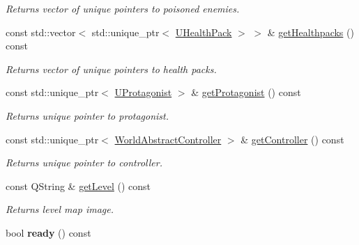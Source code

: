 \begin{DoxyCompactItemize}
\begin{DoxyCompactList}\small\item\em Returns vector of unique pointers to poisoned enemies. \end{DoxyCompactList}\item 
const std\+::vector$<$ std\+::unique\+\_\+ptr$<$ \hyperlink{classUHealthPack}{U\+Health\+Pack} $>$ $>$ \& \hyperlink{classWorldModel_a81a07a89bb6f67371553656b1780f54d}{get\+Healthpacks} () const \hypertarget{classWorldModel_a81a07a89bb6f67371553656b1780f54d}{}\label{classWorldModel_a81a07a89bb6f67371553656b1780f54d}

\begin{DoxyCompactList}\small\item\em Returns vector of unique pointers to health packs. \end{DoxyCompactList}\item 
const std\+::unique\+\_\+ptr$<$ \hyperlink{classUProtagonist}{U\+Protagonist} $>$ \& \hyperlink{classWorldModel_ae77f38af10f91c3ce963633530f0644a}{get\+Protagonist} () const \hypertarget{classWorldModel_ae77f38af10f91c3ce963633530f0644a}{}\label{classWorldModel_ae77f38af10f91c3ce963633530f0644a}

\begin{DoxyCompactList}\small\item\em Returns unique pointer to protagonist. \end{DoxyCompactList}\item 
const std\+::unique\+\_\+ptr$<$ \hyperlink{classWorldAbstractController}{World\+Abstract\+Controller} $>$ \& \hyperlink{classWorldModel_a7cf1b1a42990ab40ccd638ae868f5f21}{get\+Controller} () const \hypertarget{classWorldModel_a7cf1b1a42990ab40ccd638ae868f5f21}{}\label{classWorldModel_a7cf1b1a42990ab40ccd638ae868f5f21}

\begin{DoxyCompactList}\small\item\em Returns unique pointer to controller. \end{DoxyCompactList}\item 
const Q\+String \& \hyperlink{classWorldModel_a1f4957f65c7b044dffe4d4c5e6886438}{get\+Level} () const \hypertarget{classWorldModel_a1f4957f65c7b044dffe4d4c5e6886438}{}\label{classWorldModel_a1f4957f65c7b044dffe4d4c5e6886438}

\begin{DoxyCompactList}\small\item\em Returns level map image. \end{DoxyCompactList}\item 
bool {\bfseries ready} () const \hypertarget{classWorldModel_a1ccf488139cdbfa6a25262d01a0401d5}{}\label{classWorldModel_a1ccf488139cdbfa6a25262d01a0401d5}

\end{DoxyCompactItemize}



